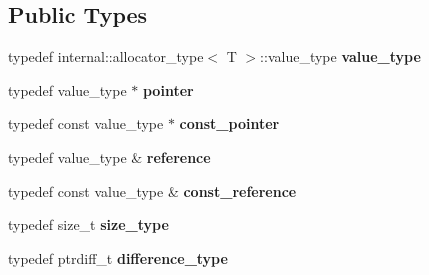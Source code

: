 \subsection*{Public Types}
\begin{DoxyCompactItemize}
\item 
\hypertarget{classtbb_1_1cache__aligned__allocator_a7aba3042b0a1c934879d5299f0c20e7e}{}typedef internal\+::allocator\+\_\+type$<$ T $>$\+::value\+\_\+type {\bfseries value\+\_\+type}\label{classtbb_1_1cache__aligned__allocator_a7aba3042b0a1c934879d5299f0c20e7e}

\item 
\hypertarget{classtbb_1_1cache__aligned__allocator_a6fabbb51a8fd7b270b94fc4d9548847b}{}typedef value\+\_\+type $\ast$ {\bfseries pointer}\label{classtbb_1_1cache__aligned__allocator_a6fabbb51a8fd7b270b94fc4d9548847b}

\item 
\hypertarget{classtbb_1_1cache__aligned__allocator_a35edf40f1bb3418f61e7d33c9f796824}{}typedef const value\+\_\+type $\ast$ {\bfseries const\+\_\+pointer}\label{classtbb_1_1cache__aligned__allocator_a35edf40f1bb3418f61e7d33c9f796824}

\item 
\hypertarget{classtbb_1_1cache__aligned__allocator_ac9f2f6c7ca74e1f3968d838eec2c4dcb}{}typedef value\+\_\+type \& {\bfseries reference}\label{classtbb_1_1cache__aligned__allocator_ac9f2f6c7ca74e1f3968d838eec2c4dcb}

\item 
\hypertarget{classtbb_1_1cache__aligned__allocator_af50d27e385aea41dbb8a9cd0734f1c84}{}typedef const value\+\_\+type \& {\bfseries const\+\_\+reference}\label{classtbb_1_1cache__aligned__allocator_af50d27e385aea41dbb8a9cd0734f1c84}

\item 
\hypertarget{classtbb_1_1cache__aligned__allocator_a51eed827a49fd636d1d6c73908f9635b}{}typedef size\+\_\+t {\bfseries size\+\_\+type}\label{classtbb_1_1cache__aligned__allocator_a51eed827a49fd636d1d6c73908f9635b}

\item 
\hypertarget{classtbb_1_1cache__aligned__allocator_a8bf47c52cdeee1bc0dcd410cc97faeec}{}typedef ptrdiff\+\_\+t {\bfseries difference\+\_\+type}\label{classtbb_1_1cache__aligned__allocator_a8bf47c52cdeee1bc0dcd410cc97faeec}

\end{DoxyCompactItemize}

